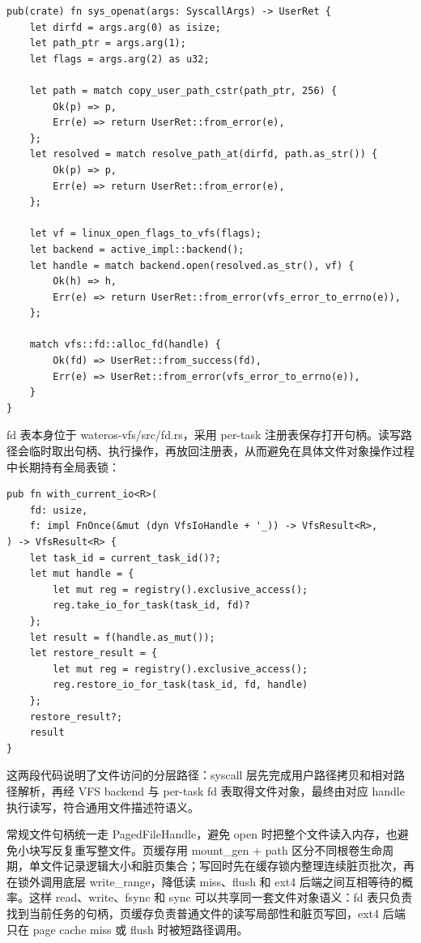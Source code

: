 \documentclass[12pt,openany,oneside,AutoFakeBold=true]{ctexbook}
\newcommand{\code}[1]{\textnormal{\rmfamily #1}}
\newcommand{\syscall}[1]{\textnormal{\rmfamily #1}}
\begin{document}
\begin{lstlisting}
pub(crate) fn sys_openat(args: SyscallArgs) -> UserRet {
    let dirfd = args.arg(0) as isize;
    let path_ptr = args.arg(1);
    let flags = args.arg(2) as u32;

    let path = match copy_user_path_cstr(path_ptr, 256) {
        Ok(p) => p,
        Err(e) => return UserRet::from_error(e),
    };
    let resolved = match resolve_path_at(dirfd, path.as_str()) {
        Ok(p) => p,
        Err(e) => return UserRet::from_error(e),
    };

    let vf = linux_open_flags_to_vfs(flags);
    let backend = active_impl::backend();
    let handle = match backend.open(resolved.as_str(), vf) {
        Ok(h) => h,
        Err(e) => return UserRet::from_error(vfs_error_to_errno(e)),
    };

    match vfs::fd::alloc_fd(handle) {
        Ok(fd) => UserRet::from_success(fd),
        Err(e) => UserRet::from_error(vfs_error_to_errno(e)),
    }
}
\end{lstlisting}

fd 表本身位于 \code{wateros-vfs/src/fd.rs}，采用 per-task 注册表保存打开句柄。读写路径会临时取出句柄、执行操作，再放回注册表，从而避免在具体文件对象操作过程中长期持有全局表锁：

\begin{lstlisting}
pub fn with_current_io<R>(
    fd: usize,
    f: impl FnOnce(&mut (dyn VfsIoHandle + '_)) -> VfsResult<R>,
) -> VfsResult<R> {
    let task_id = current_task_id()?;
    let mut handle = {
        let mut reg = registry().exclusive_access();
        reg.take_io_for_task(task_id, fd)?
    };
    let result = f(handle.as_mut());
    let restore_result = {
        let mut reg = registry().exclusive_access();
        reg.restore_io_for_task(task_id, fd, handle)
    };
    restore_result?;
    result
}
\end{lstlisting}

这两段代码说明了文件访问的分层路径：syscall 层先完成用户路径拷贝和相对路径解析，再经 VFS backend 与 per-task fd 表取得文件对象，最终由对应 handle 执行读写，符合通用文件描述符语义。

常规文件句柄统一走 \code{PagedFileHandle}，避免 \code{open} 时把整个文件读入内存，也避免小块写反复重写整文件。页缓存用 \code{mount\_gen + path} 区分不同根卷生命周期，单文件记录逻辑大小和脏页集合；写回时先在缓存锁内整理连续脏页批次，再在锁外调用底层 \code{write\_range}，降低读 miss、flush 和 ext4 后端之间互相等待的概率。这样 \syscall{read}、\syscall{write}、\syscall{fsync} 和 \syscall{sync} 可以共享同一套文件对象语义：fd 表只负责找到当前任务的句柄，页缓存负责普通文件的读写局部性和脏页写回，ext4 后端只在 page cache miss 或 flush 时被短路径调用。
\end{document}

